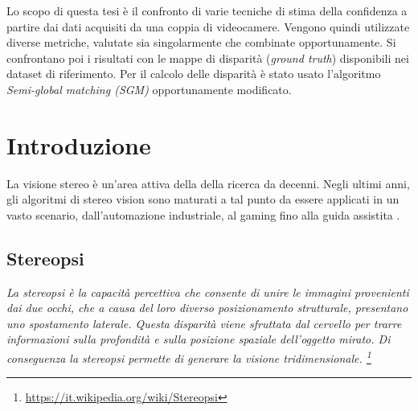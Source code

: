 \documentclass[12pt]{report}
\newcommand{\nullpage}{\newpage\null\thispagestyle{empty}}  %
\begin{document}
	Lo scopo di questa tesi è il confronto di varie tecniche di stima della confidenza a partire dai dati acquisiti da una coppia di videocamere. Vengono quindi utilizzate diverse metriche, valutate sia singolarmente che combinate opportunamente. Si confrontano poi i risultati con le mappe di disparità (\textit{ground truth}) disponibili nei dataset di riferimento. Per il calcolo delle disparità è stato usato l'algoritmo \textit{Semi-global matching (SGM)} opportunamente modificato. 
	

	\nullpage						%
	\tableofcontents				%
	\nullpage						%

	\renewcommand{\thepage}{\arabic{page}} %
	\setcounter{page}{1}                   %


	\chapter{Introduzione}
	\label{sec:introduzione}
	\pagestyle{fancy}
	
		La visione stereo è un'area attiva della della ricerca da decenni. Negli ultimi anni, gli algoritmi di stereo vision sono maturati a tal punto da essere applicati in un vasto scenario, dall'automazione industriale, al gaming fino alla guida assistita \cite{mercedes}.
	
		\section{Stereopsi}
		\label{sec:Stereopsi}
			\textit{
			La stereopsi è la capacità percettiva che consente di unire le immagini provenienti dai due occhi, che a causa del loro diverso posizionamento strutturale, presentano uno spostamento laterale. Questa disparità viene sfruttata dal cervello per trarre informazioni sulla profondità e sulla posizione spaziale dell'oggetto mirato. Di conseguenza la stereopsi permette di generare la visione tridimensionale. \footnote{\url{https://it.wikipedia.org/wiki/Stereopsi}} \newline}
			
\end{document}
